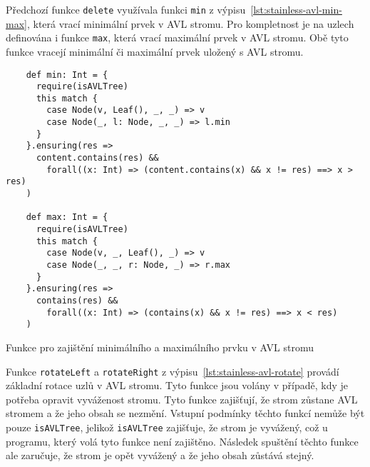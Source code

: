 Předchozí funkce \texttt{delete} využívala funkci \texttt{min} z výpisu~\ref{lst:stainless-avl-min-max},
která vrací minimální prvek v AVL stromu.
Pro kompletnost je na uzlech definována i funkce \texttt{max},
která vrací maximální prvek v AVL stromu.
Obě tyto funkce vracejí minimální či maximální prvek uložený s AVL stromu.

\begin{listing}[H]
  \begin{verbatim}
    def min: Int = {
      require(isAVLTree)
      this match {
        case Node(v, Leaf(), _, _) => v
        case Node(_, l: Node, _, _) => l.min
      }
    }.ensuring(res =>
      content.contains(res) &&
        forall((x: Int) => (content.contains(x) && x != res) ==> x > res)
    )

    def max: Int = {
      require(isAVLTree)
      this match {
        case Node(v, _, Leaf(), _) => v
        case Node(_, _, r: Node, _) => r.max
      }
    }.ensuring(res =>
      contains(res) &&
        forall((x: Int) => (contains(x) && x != res) ==> x < res)
    )
  \end{verbatim}
  \caption{Funkce pro zajištění minimálního a maximálního prvku v AVL stromu}
  \label{lst:stainless-avl-min-max}
\end{listing}

Funkce \texttt{rotateLeft} a \texttt{rotateRight}
z výpisu~\ref{lst:stainless-avl-rotate}
provádí základní rotace uzlů v AVL stromu.
Tyto funkce jsou volány v případě, kdy je potřeba opravit vyváženost stromu.
Tyto funkce zajišťují, že strom zůstane AVL stromem a že jeho obsah se nezmění.
Vstupní podmínky těchto funkcí nemůže být pouze \texttt{isAVLTree},
jelikož \texttt{isAVLTree} zajišťuje, že strom je vyvážený,
což u programu, který volá tyto funkce není zajištěno.
Následek spuštění těchto funkce ale zaručuje,
že strom je opět vyvážený a že jeho obsah zůstává stejný.


